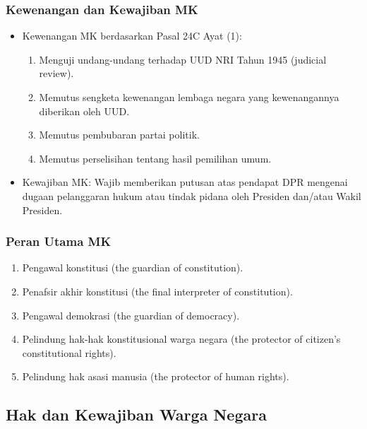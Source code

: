 \subsubsection{Kewenangan dan Kewajiban MK}
\begin{itemize}
\item Kewenangan MK berdasarkan Pasal 24C Ayat (1):
  \begin{enumerate}
  \item Menguji undang-undang terhadap UUD NRI Tahun 1945 (judicial review).
  \item Memutus sengketa kewenangan lembaga negara yang kewenangannya diberikan oleh UUD.
  \item Memutus pembubaran partai politik.
  \item Memutus perselisihan tentang hasil pemilihan umum.
  \end{enumerate}
\item Kewajiban MK: Wajib memberikan putusan atas pendapat DPR mengenai dugaan pelanggaran hukum atau tindak pidana oleh Presiden dan/atau Wakil Presiden.
\end{itemize}

\subsubsection{Peran Utama MK}
\begin{enumerate}
\item Pengawal konstitusi (the guardian of constitution).
\item Penafsir akhir konstitusi (the final interpreter of constitution).
\item Pengawal demokrasi (the guardian of democracy).
\item Pelindung hak-hak konstitusional warga negara (the protector of citizen's constitutional rights).
\item Pelindung hak asasi manusia (the protector of human rights).
\end{enumerate}

\subsection{Hak dan Kewajiban Warga Negara}

